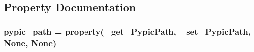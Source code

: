 \subsection{Property Documentation}
\hypertarget{classpyneb_1_1utils_1_1_config_1_1___config_a2cb68c3749e1d6a9c68b83594bfb2973}{
\subsubsection[{pypic\-\_\-path}]{\setlength{\rightskip}{0pt plus 5cm}pypic\-\_\-path = property(\-\_\-get\-\_\-\-Pypic\-Path, \-\_\-set\-\_\-\-Pypic\-Path, None, None)\hspace{0.3cm}{\ttfamily [static]}}}\label{classpyneb_1_1utils_1_1_config_1_1___config_a2cb68c3749e1d6a9c68b83594bfb2973}
